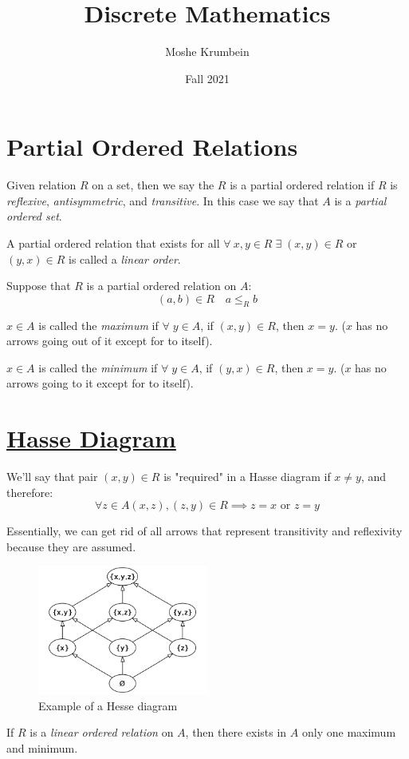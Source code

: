 \documentclass[00_complete]{subfiles}
\title{Discrete Mathematics}
\author{Moshe Krumbein}
\date{Fall 2021}
\begin{document}

\section{Partial Ordered Relations}

Given relation \(R\) on a set, then we say the \(R\) is a partial ordered
relation if \(R\) is \emph{reflexive}, \emph{antisymmetric}, and
\emph{transitive}. In this case we say that \(A\) is a \emph{partial ordered
set}.

\begin{definition}
A partial ordered relation that exists for all
\(\forall \: x,y \in R \;\exists\; (x,y) \in R\) or \((y,x) \in R\) is
called a \emph{linear order}.
\end{definition}

Suppose that \(R\) is a partial ordered relation on \(A\):
\[(a,b) \in R \quad a \leq_R b\]

\(x \in A\) is called the \emph{maximum} if \(\forall \; y \in A\), if
\((x,y) \in R\), then \(x=y\). (\(x\) has no arrows going out of it
except for to itself).

\(x \in A\) is called the \emph{minimum} if \(\forall \; y \in A\), if
\((y,x) \in R\), then \(x=y\). (\(x\) has no arrows going to it except
for to itself).

\section{\href{https://en.wikipedia.org/wiki/Hasse_diagram}{Hasse
Diagram}}

We'll say that pair \((x,y) \in R\) is "required" in a Hasse diagram
if \(x \neq y\), and therefore:
\[\forall z \in A (x,z),(z,y) \in R \implies z=x \text{ or } z=y\]

Essentially, we can get rid of all arrows that represent transitivity and
reflexivity because they are assumed.

\begin{figure}[ht!]
    \centering
    \includegraphics[width=0.5\textwidth]{w4-hesse}
    \caption{Example of a Hesse diagram}
\end{figure}

\begin{claim}
If \(R\) is a \emph{linear ordered relation} on \(A\), then there exists in
\(A\) only one maximum and minimum.
\end{claim}
\end{document}
